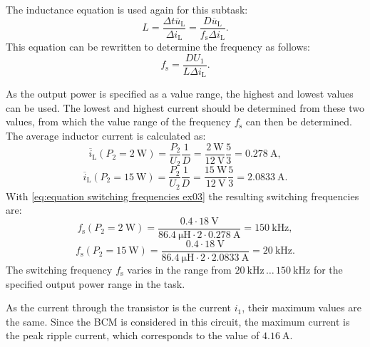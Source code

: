  \begin{solutionblock}
     The inductance equation is used again for this subtask:
     \begin{equation}
        L = \frac{\Delta t \overline u_{\mathrm{L}}}{\Delta i_{\mathrm{L}}}= \frac{D \overline u_{\mathrm{L}}}{f_\mathrm{s}\Delta i_{\mathrm{L}}}.
     \end{equation}
     This equation can be rewritten to determine the frequency as follows:
     \begin{equation}
        f_\mathrm{s} = \frac{DU_{\mathrm{1}}}{L\Delta i_{\mathrm{L}}}. \label{eq:equation switching frequencies ex03}
     \end{equation}
      
As the output power is specified as a value range, the highest and lowest values can be used. The lowest and highest current should be determined from these two values, from which the value range of the frequency $f_\mathrm{s}$ can then be determined.
The average inductor current is calculated as:
     \begin{equation}
        \overline{i}_\mathrm{L}(P_\mathrm{2}=\SI{2}{\watt})= \frac{P_\mathrm{2}}{U_\mathrm{2}}\frac{1}{D}=\frac{\SI{2}{\watt}}{\SI{12}{\volt}}\frac{5}{3}=\SI{0.278}{\ampere},
     \end{equation}
     \begin{equation}
        \overline{i}_\mathrm{L}(P_\mathrm{2}=\SI{15}{\watt})= \frac{P_\mathrm{2}}{U_\mathrm{2}}\frac{1}{D}=\frac{\SI{15}{\watt}}{\SI{12}{\volt}}\frac{5}{3}=\SI{2.0833}{\ampere}.
     \end{equation}
     With \eqref{eq:equation switching frequencies ex03} the resulting switching frequencies are:
     \begin{equation}
        f_\mathrm{s}(P_\mathrm{2}=\SI{2}{\watt})=\frac{0.4\cdot\SI{18}{\volt}}{\SI{86.4}{\micro\henry}\cdot 2\cdot \SI{0.278}{\ampere}}=\SI{150}{\kilo \hertz},
     \end{equation}
     \begin{equation}
        f_\mathrm{s}(P_\mathrm{2}=\SI{15}{\watt})=\frac{0.4\cdot\SI{18}{\volt}}{\SI{86.4}{\micro\henry}\cdot 2\cdot \SI{2.0833}{\ampere}}=\SI{20}{\kilo \hertz}.
     \end{equation}
     The switching frequency $f_\mathrm{s}$ varies in the range from $\SI{20}{\kilo \hertz} \, \dots \, \SI{150}{\kilo \hertz}$ for the specified output power range in the task.
 \end{solutionblock}

 \begin{solutionblock}
    As the current through the transistor is the current $i_1$, their maximum values are the same. Since the BCM is considered in this circuit, the maximum current is the peak ripple current, which corresponds to the value of $\SI{4.16}{\ampere}$.
 \end{solutionblock}


